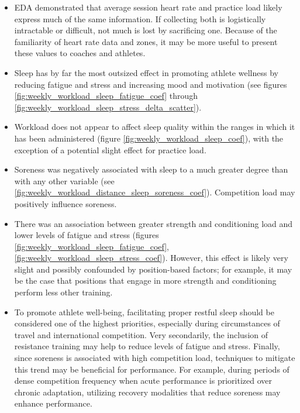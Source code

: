 \documentclass{article}
\begin{document}
			\begin{itemize}
				\item EDA demonstrated that average session heart rate and
				practice load likely express much of the same information.
				If collecting both is logistically intractable or difficult,
				not much is lost by sacrificing one. Because of the familiarity
				of heart rate data and zones, it may be more useful to present
				these values to coaches and athletes.
				\item Sleep has by far the most outsized effect in promoting
				athlete wellness by reducing fatigue and stress and increasing
				mood and motivation (see figures
				\ref{fig:weekly_workload_sleep_fatigue_coef} through
				\ref{fig:weekly_workload_sleep_stress_delta_scatter}).
				\item Workload does not appear to affect sleep quality within
				the ranges in which it has been administered (figure
				\ref{fig:weekly_workload_sleep_coef}), with the exception of a potential
				slight effect for practice load.
				\item Soreness was negatively associated with sleep to a much
				greater degree than with any other variable (see
				\ref{fig:weekly_workload_distance_sleep_soreness_coef}).
				Competition load may positively influence soreness.
				\item There was an association between greater
				strength and conditioning load and lower levels of fatigue
				and stress (figures \ref{fig:weekly_workload_sleep_fatigue_coef},
				\ref{fig:weekly_workload_sleep_stress_coef}).
				However, this effect is likely very slight and possibly
				confounded by position-based factors; for example, it may be
				the case that positions that engage in more strength and
				conditioning perform less other training.
				\item To promote athlete well-being, facilitating proper
				restful sleep should be considered one of the highest priorities,
				especially during circumstances of travel and international
				competition. Very
				secondarily, the inclusion of resistance training may help to
				reduce levels of fatigue and stress. Finally, since soreness is
				associated with high competition load, techniques to mitigate
				this trend may be beneficial for performance. For example,
				during periods of dense competition frequency when acute
				performance is prioritized over chronic adaptation, utilizing
				recovery modalities that reduce soreness may enhance performance.
			\end{itemize}
\end{document}
